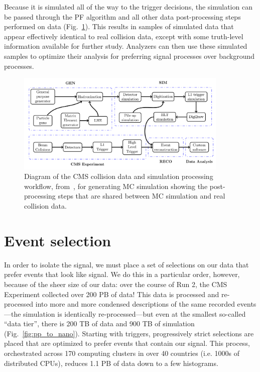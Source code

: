 Because it is simulated all of the way to the trigger decisions, the simulation can be passed through the PF algorithm and all other data post-processing steps performed on data (Fig.~\ref{fig:mcgen_diagram}). 
This results in samples of simulated data that appear effectively identical to real collision data, except with some truth-level information available for further study. 
Analyzers can then use these simulated samples to optimize their analysis for preferring signal processes over background processes.

\begin{figure}[htb]
    \centering
    \includegraphics[width=0.9\textwidth]{fig/cms/mcgen_diagram.png}
    \caption[Diagram of the CMS collision data and simulation processing workflow]{
        Diagram of the CMS collision data and simulation processing workflow, from~\cite{CMSOpenDataMC}, for generating MC simulation showing the post-processing steps that are shared between MC simulation and real collision data. 
    }
    \label{fig:mcgen_diagram}
\end{figure}

\section{Event selection}
In order to isolate the signal, we must place a set of selections on our data that prefer events that look like signal. 
We do this in a particular order, however, because of the sheer size of our data: over the course of Run 2, the CMS Experiment collected over 200 PB of data! 
This data is processed and re-processed into more and more condensed descriptions of the same recorded events---the simulation is identically re-processed---but even at the smallest so-called ``data tier'', there is 200 TB of data and 900 TB of simulation (Fig.~\ref{fig:pp_to_nano}). 
Starting with triggers, progressively strict selections are placed that are optimized to prefer events that contain our signal. 
This process, orchestrated across 170 computing clusters in over 40 countries (i.e. 1000s of distributed CPUs), reduces 1.1 PB of data down to a few histograms. %

